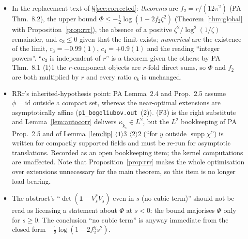 \documentclass[11pt]{article}
\newcommand{\kt}{\widetilde k}
\newcommand{\one}{\mathbf 1}
\begin{document}
\begin{itemize}\itemsep2pt
\item In the replacement text of \S\ref{sec:corrected}: \emph{theorems} are
 $f_2=r/(12\pi^2)$ (PA Thm.~8.2), the upper bound $\Phi\le-\frac12\log(1-2f_2\zeta^2)$
 (Theorem~\ref{thm:global} with Proposition~\ref{prop:rrr}), the absence of a positive
 $\zeta^2/\log^2(1/\zeta)$ remainder, and $c_3\le0$ given that the limit exists;
 \emph{numerical} are the existence of the limit, $c_3=-0.99(1)$, $c_4=+0.9(1)$ and the reading
 ``integer powers''.  ``$c_3$ is independent of $r$'' is a theorem given the others: by PA
 Thm.~8.1 $\langle1\rangle1$ the $r$-component objects are $r$-fold direct sums, so $\Phi$ and
 $f_2$ are both multiplied by $r$ and every ratio $c_k$ is unchanged.
\item RRr's inherited-hypothesis point: PA Lemma~2.4 and Prop.~2.5 assume $\phi=\mathrm{id}$ outside
 a compact set, whereas the near-optimal extensions are asymptotically affine
 (\texttt{p1\_bogoliubov.out}~(2)).  (F3) is the right substitute and Lemma~\ref{lem:autocorr}
 delivers $\kappa_{\kt_s}\in L^2$, but the $L^2$ bookkeeping of PA Prop.~2.5 and of
 Lemma~\ref{lem:lip} $\langle1\rangle3$ $\langle2\rangle2$ (``for $y$ outside
 $\operatorname{supp}\chi$'') is written for compactly supported fields and must be re-run for
 asymptotic translations.  Recorded as an open bookkeeping item; the kernel computations are
 unaffected.  Note that Proposition~\ref{prop:rrr} makes the whole optimisation over extensions
 unnecessary for the main theorem, so this item is no longer load-bearing.
\item The abstract's ``$\det(\one-V_s^*V_s)$ even in $s$ (no cubic term)'' should not be read as
 licensing a statement about $\Phi$ at $s<0$: the bound majorises $\Phi$ only for $s\ge0$.  The
 conclusion ``no cubic term'' is anyway immediate from the closed form
 $-\frac12\log(1-2f_2^\chi s^2)$.
\end{itemize}
\end{document}
